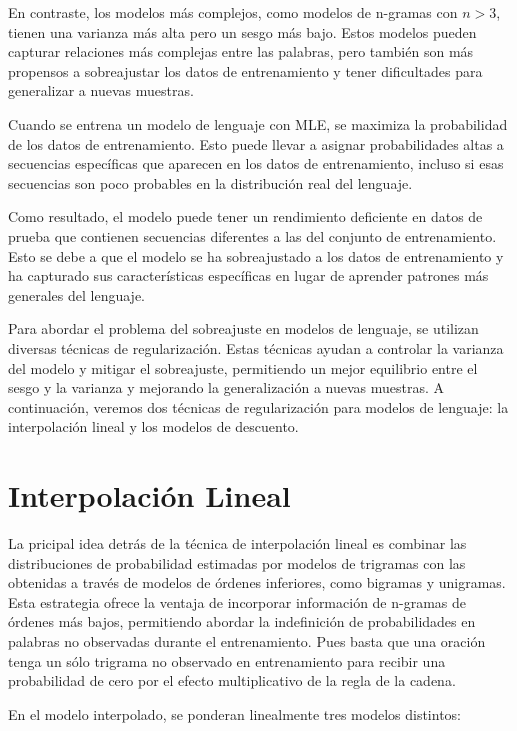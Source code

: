 En contraste, los modelos más complejos, como modelos de n-gramas con $n>3$, tienen una varianza más alta pero un sesgo más bajo. Estos modelos pueden capturar relaciones más complejas entre las palabras, pero también son más propensos a sobreajustar los datos de entrenamiento y tener dificultades para generalizar a nuevas muestras.

Cuando se entrena un modelo de lenguaje con MLE, se maximiza la probabilidad de los datos de entrenamiento. Esto puede llevar a asignar probabilidades altas a secuencias específicas que aparecen en los datos de entrenamiento, incluso si esas secuencias son poco probables en la distribución real del lenguaje.

Como resultado, el modelo puede tener un rendimiento deficiente en datos de prueba que contienen secuencias diferentes a las del conjunto de entrenamiento. Esto se debe a que el modelo se ha sobreajustado a los datos de entrenamiento y ha capturado sus características específicas en lugar de aprender patrones más generales del lenguaje.

Para abordar el problema del sobreajuste en modelos de lenguaje, se utilizan diversas técnicas de regularización. Estas técnicas ayudan a controlar la varianza del modelo y mitigar el sobreajuste, permitiendo un mejor equilibrio entre el sesgo y la varianza y mejorando la generalización a nuevas muestras. A continuación, veremos dos técnicas de regularización para modelos de lenguaje: la interpolación lineal y los modelos de descuento.




\section{Interpolación Lineal}

La pricipal idea detrás de la técnica de interpolación lineal es combinar las distribuciones de probabilidad estimadas por modelos de trigramas con las obtenidas a través de modelos de órdenes inferiores, como bigramas y unigramas. Esta estrategia ofrece la ventaja de incorporar información de n-gramas de órdenes más bajos, permitiendo abordar la indefinición de probabilidades en palabras no observadas durante el entrenamiento. Pues basta que una oración tenga un sólo trigrama no observado en entrenamiento para recibir una probabilidad de cero por el efecto multiplicativo de la regla de la cadena.

En el modelo interpolado, se ponderan linealmente tres modelos distintos:

